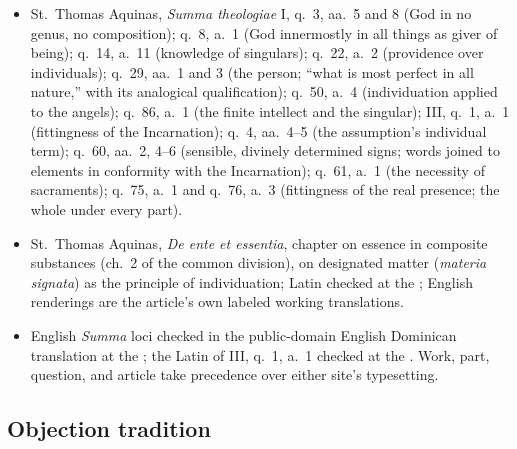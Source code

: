 {\fontsize{8.6}{9.6}\selectfont
\begin{itemize}[itemsep=0pt,parsep=0pt,topsep=0.05em]
\item St.~Thomas Aquinas, \emph{Summa theologiae} I, q.~3, aa.~5 and 8 (God in no genus, no composition); q.~8, a.~1 (God innermostly in all things as giver of being); q.~14, a.~11 (knowledge of singulars); q.~22, a.~2 (providence over individuals); q.~29, aa.~1 and 3 (the person; ``what is most perfect in all nature,'' with its analogical qualification); q.~50, a.~4 (individuation applied to the angels); q.~86, a.~1 (the finite intellect and the singular); III, q.~1, a.~1 (fittingness of the Incarnation); q.~4, aa.~4--5 (the assumption's individual term); q.~60, aa.~2, 4--6 (sensible, divinely determined signs; words joined to elements in conformity with the Incarnation); q.~61, a.~1 (the necessity of sacraments); q.~75, a.~1 and q.~76, a.~3 (fittingness of the real presence; the whole under every part).
\item St.~Thomas Aquinas, \emph{De ente et essentia}, chapter on essence in composite substances (ch.~2 of the common division), on designated matter (\emph{materia signata}) as the principle of individuation; Latin checked at the ; English renderings are the article's own labeled working translations.
\item English \emph{Summa} loci checked in the public-domain English Dominican translation at the ; the Latin of III, q.~1, a.~1 checked at the . Work, part, question, and article take precedence over either site's typesetting.
\end{itemize}}

\subsection*{Objection tradition}

